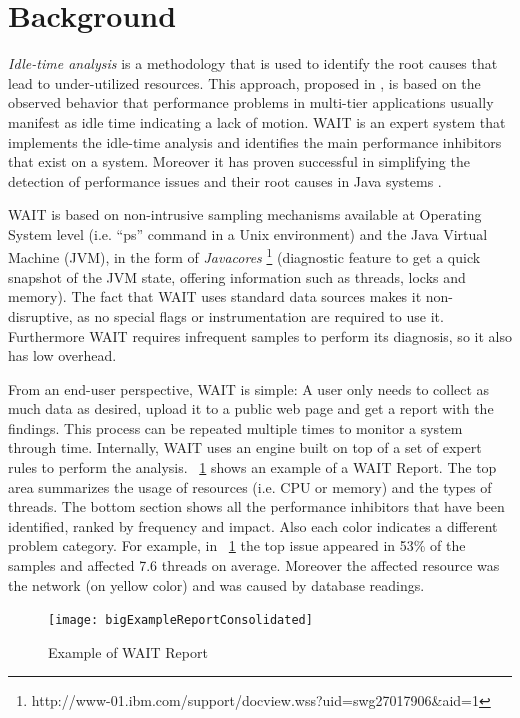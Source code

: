 \documentclass[runningheads,a4paper]{llncs}
\begin{document}
\section{Background}
\label{Background}
\vspace{-7pt}
\emph{Idle-time analysis} is a methodology that is used to identify the root
causes that lead to under-utilized resources. This approach, proposed in
\cite{Altman2010}, is based on the observed behavior that performance problems in multi-tier
applications usually manifest as idle time indicating a lack of motion.
WAIT is an expert system that implements the idle-time analysis and identifies
the main performance inhibitors that exist on a system. Moreover it has proven successful in simplifying the detection of performance issues and their root causes in Java
systems \cite{Altman2010,Wu1}.

WAIT is based on non-intrusive sampling mechanisms available at
Operating System level (i.e. ``ps'' command in a Unix environment) and the Java
Virtual Machine (JVM), in the form of \emph{Javacores}
\footnote{http://www-01.ibm.com/support/docview.wss?uid=swg27017906\&aid=1}
(diagnostic feature to get a quick snapshot of the JVM state, offering
information such as threads, locks and memory). The fact that WAIT uses standard
data sources makes it non-disruptive, as no special flags or instrumentation are
required to use it. Furthermore WAIT requires infrequent samples to perform its
diagnosis, so it also has low overhead.

From an end-user perspective, WAIT is simple: A user only needs to
collect as much data as desired, upload it to a public web page and get a
report with the findings. This process can be repeated multiple times to monitor a
system through time. Internally, WAIT uses an engine built on top of a set of 
expert rules to perform the analysis. \figurename ~\ref{fig_WAITReport} shows an
example of a WAIT Report. The top area summarizes the usage of resources (i.e.
CPU or memory) and the types of threads. The bottom section shows all
the performance inhibitors that have been identified, ranked by frequency and impact. 
Also each color indicates a different problem category. For example, in
\figurename ~\ref{fig_WAITReport} the top issue appeared in 53\% of the samples
and affected 7.6 threads on average. Moreover the affected resource was the
network (on yellow color) and was caused by database readings.

\begin{figure}[!h]
\centering
\texttt{[image: bigExampleReportConsolidated]}
\caption{Example of WAIT Report}
\label{fig_WAITReport}
\end{figure}
\end{document}
